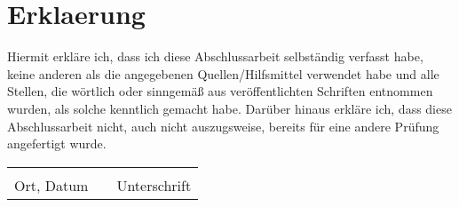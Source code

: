 \pagestyle{empty}
\newpage
\section*{Erklaerung}

Hiermit erkläre ich, dass ich diese Abschlussarbeit selbständig verfasst
habe, keine anderen als die angegebenen Quellen/Hilfsmittel verwendet
habe und alle Stellen, die wörtlich oder sinngemäß aus veröffentlichten
Schriften entnommen wurden, als solche kenntlich gemacht habe. Darüber
hinaus erkläre ich, dass diese Abschlussarbeit nicht, auch nicht auszugsweise,
bereits für eine andere Prüfung angefertigt wurde.\\
\begin{tabular}{lp{3em}l}
\vspace{1cm}
 \hspace{6cm}   && \hspace{6cm} \\\cline{1-1}\cline{3-3}
 Ort, Datum     && Unterschrift
\end{tabular}


\blankpage





%
%
